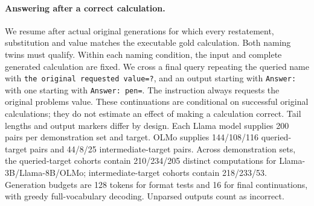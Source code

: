 \paragraph{Answering after a correct calculation.}
We resume after actual original generations for which every restatement, substitution and value matches the executable gold calculation. Both naming twins must qualify. Within each naming condition, the input and complete generated calculation are fixed. We cross a final query repeating the queried name with \texttt{the original requested value=?}, and an output starting with \texttt{Answer:} with one starting with \texttt{Answer: pen=}. The instruction always requests the original problem\textquotesingle s value. These continuations are conditional on successful original calculations; they do not estimate an effect of making a calculation correct. Tail lengths and output markers differ by design.
Each Llama model supplies 200 pairs per demonstration set and target. OLMo supplies 144/108/116 queried-target pairs and 44/8/25 intermediate-target pairs. Across demonstration sets, the queried-target cohorts contain 210/234/205 distinct computations for Llama-3B/Llama-8B/OLMo; intermediate-target cohorts contain 218/233/53. Generation budgets are 128 tokens for format tests and 16 for final continuations, with greedy full-vocabulary decoding. Unparsed outputs count as incorrect.
